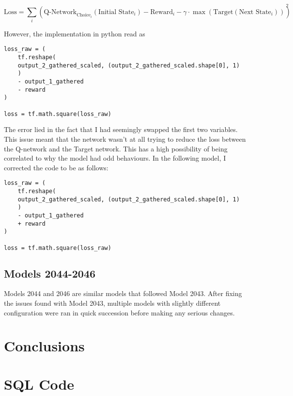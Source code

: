 \documentclass[12pt]{article}
\begin{document}
$$\text{Loss} = \sum_{i}{(\text{Q-Network}_{\text{Choice}_i}(\text{Initial State}_i) - \text{Reward}_i - \gamma \cdot \max{(\text{Target}(\text{Next State}_i))})^2}$$


However, the implementation in python read as 

\begin{verbatim}
loss_raw = (
	tf.reshape(
  	output_2_gathered_scaled, (output_2_gathered_scaled.shape[0], 1)
 	)
 	- output_1_gathered
 	- reward
)

loss = tf.math.square(loss_raw)
\end{verbatim}

The error lied in the fact that I had seemingly swapped the first two variables. This issue meant that the network wasn't at all trying to reduce the loss between the Q-network and the Target network. This has a high possibility of being correlated to why the model had odd behaviours. In the following model, I corrected the code to be as follows:



\begin{verbatim}
loss_raw = (
	tf.reshape(
  	output_2_gathered_scaled, (output_2_gathered_scaled.shape[0], 1)
 	)
 	- output_1_gathered
 	+ reward
)

loss = tf.math.square(loss_raw)
\end{verbatim}


\newpage


\subsection{Models 2044-2046}

Models 2044 and 2046 are similar models that followed Model 2043. After fixing the issues found with Model 2043, multiple models with slightly different configuration were ran in quick succession before making any serious changes.

\newpage

\section{Conclusions}


\newpage

\appendix

\section{SQL Code}
\end{document}
